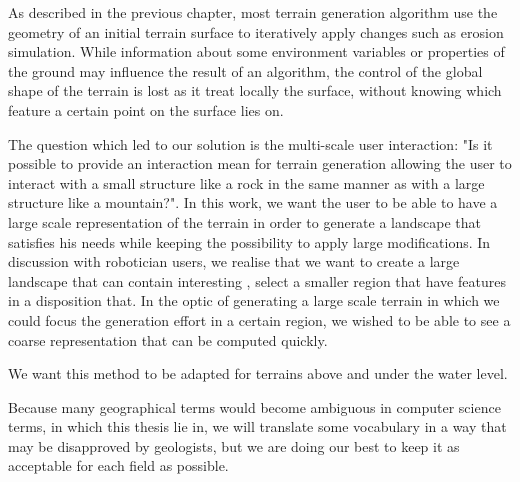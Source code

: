 As described in the previous chapter, most terrain generation algorithm use the geometry of an initial terrain surface to iteratively apply changes such as erosion simulation. While information about some environment variables or properties of the ground may influence the result of an algorithm, the control of the global shape of the terrain is lost as it treat locally the surface, without knowing which feature a certain point on the surface lies on.

The question which led to our solution is the multi-scale user interaction: "Is it possible to provide an interaction mean for terrain generation allowing the user to interact with a small structure like a rock in the same manner as with a large structure like a mountain?". 
In this work, we want the user to be able to have a large scale representation of the terrain in order to generate a landscape that satisfies his needs while keeping the possibility to apply large modifications.
In discussion with robotician users, we realise that we want to create a large landscape that can contain interesting , select a smaller region that have features in a disposition that.
In the optic of generating a large scale terrain in which we could focus the generation effort in a certain region, we wished to be able to see a coarse representation that can be computed quickly.

We want this method to be adapted for terrains above and under the water level.

Because many geographical terms would become ambiguous in computer science terms, in which this thesis lie in, we will translate some vocabulary in a way that may be disapproved by geologists, but we are doing our best to keep it as acceptable for each field as possible.


